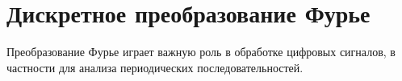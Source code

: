 \chapter{Дискретное преобразование Фурье}
\label{AddFourier}

Преобразование Фурье играет важную
роль в обработке цифровых сигналов, в частности для анализа
периодических последовательностей.




